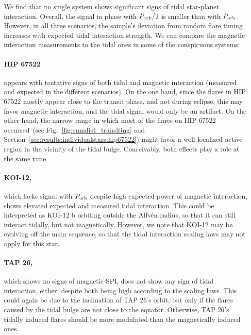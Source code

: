 \documentclass[twocolumn]{aastex631}
\begin{document}
We find that no single system shows significant signs of tidal star-planet interaction. Overall, the signal in phase with $P_{\rm orb}/2$ is smaller than with $P_{\rm orb}$. However, in all three scenarios, the sample's deviation from random flare timing increases with expected tidal interaction strength. We can compare the magnetic interaction measurements to the tidal ones in some of the conspicuous systems:

\paragraph{HIP 67522} appears with tentative signs of both tidal and magnetic interaction (measured and expected in the different scenarios). On the one hand, since the flares in HIP 67522 mostly appear close to the transit phase, and not during eclipse, this may favor magnetic interaction, and the tidal signal would only be an artifact. On the other hand, the narrow range in which most of the flares on HIP 67522 occurred~(see Fig.~\ref{fig:cumdist_transiting} and Section~\ref{sec:results:individualstars:hip67522}) might favor a well-localized active region in the vicinity of the tidal bulge. Conceivably, both effects play a role at the same time.

\paragraph{KOI-12,} which lacks signal with $P_{\rm orb}$ despite high expected power of magnetic interaction, shows elevated expected and measured tidal interaction. This could be interpreted as KOI-12 b orbiting outside the Alfv\'en radius, so that it can still interact tidally, but not magnetically. However, we note that KOI-12 may be evolving off the main sequence, so that the tidal interaction scaling laws may not apply for this star. 

\paragraph{TAP 26,} which shows no signs of magnetic SPI, does not show any sign of tidal interaction, either, despite both being high according to the scaling laws. This could again be due to the inclination of TAP 26's orbit, but only if the flares caused by the tidal bulge are not close to the equator. Otherwise, TAP 26's tidally induced flares should be more modulated than the magnetically induced ones.
\end{document}

